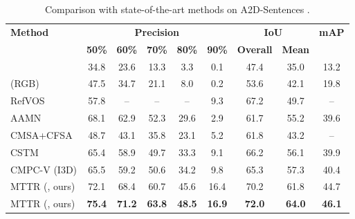 \documentclass[10pt,twocolumn,letterpaper]{article}
\renewcommand{\cite}[1]{\citep{#1}}
\newcommand{\methodname}{MTTR}
\begin{document}
 
\begin{table*}
	\centering
    \setlength\extrarowheight{0.5pt}
\begin{tabular}{@{\extracolsep{4pt}}l ccccc cc c@{}} 
\toprule	 	
	\multirow{2}{*}{\textbf{Method}} &\multicolumn{5}{c}{\textbf{Precision}} &\multicolumn{2}{c}{\textbf{IoU}} & \multirow{2}{*}{\textbf{mAP}}  \\ \cline{2-6}\cline{7-8}
    & \textbf{50\%} & \textbf{60\%} & \textbf{70\%} & \textbf{80\%} & \textbf{90\%}   & \textbf{Overall}   & \textbf{Mean}  & \\
\midrule	
\citet{hu2016segmentation} &34.8 & 23.6& 13.3 &3.3 & 0.1&47.4 &35.0 & 13.2\\
\citet{gavrilyuk2018a2d} (RGB) &47.5 & 34.7 & 21.1 & 8.0 & 0.2 &53.6 & 42.1 & 19.8 \\
RefVOS \cite{bellver2020refvos}  &57.8& -- & -- & -- & 9.3 &67.2 &49.7 & --\\
AAMN \cite{yang2020aamn} &68.1 & 62.9 &52.3& 29.6& 2.9&61.7& 55.2& 39.6 \\
CMSA+CFSA \cite{ye2021cfsa} &48.7& 43.1 &35.8 &23.1 &5.2&61.8& 43.2& --\\
CSTM \cite{hui2021cstm}  & 65.4& 58.9 &49.7 &33.3 &9.1 & 66.2 & 56.1 & 39.9\\
CMPC-V (I3D) \cite{liu2021cmpc} &65.5 & 59.2 & 50.6 & 34.2 & 9.8 &65.3& 57.3& 40.4\\
\midrule
\methodname{} (, ours) &72.1&68.4&60.7&45.6&16.4&70.2&61.8&44.7\\
\methodname{} (, ours) &\textbf{75.4}&\textbf{71.2}&\textbf{63.8}&\textbf{48.5}&\textbf{16.9}&\textbf{72.0}&\textbf{64.0}&\textbf{46.1}\\
		\bottomrule
	\end{tabular}
\vspace{-0.2cm}
	\caption
		{Comparison with state-of-the-art methods on A2D-Sentences \cite{gavrilyuk2018a2d}.
		}
	\label{tbl:a2ds}
	\vspace{-0.3cm}
\end{table*}
\end{document}
